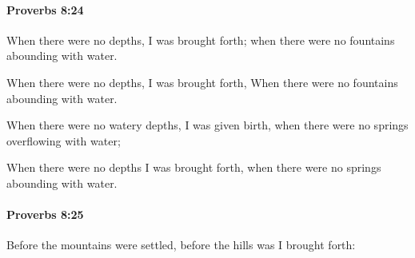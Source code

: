 		\paragraph{Proverbs 8:24} %
			\label{PROVERBS-8-24}

			When there were no depths, I was brought forth; when there were no fountains abounding with water.

			\begin{versebox}
					\item[BHS] 
					\item[ASV] When there were no depths, I was brought forth, When there were no fountains abounding with water.
					\item[NIV] When there were no watery depths, I was given birth, when there were no springs overflowing with water;
					\item[NRSV] When there were no depths I was brought forth, when there were no springs abounding with water.
			\end{versebox}

		\paragraph{Proverbs 8:25} %
			\label{PROVERBS-8-25}

			Before the mountains were settled, before the hills was I brought forth:

